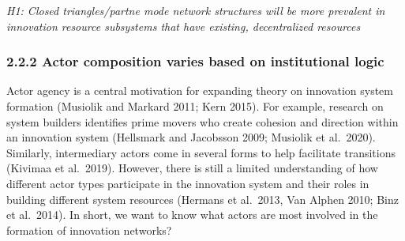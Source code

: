\documentclass[twoside,12pt,final]{ucthesis-CA2012}
\begin{document}
\begin{ucmainmatter}
\emph{H1: Closed triangles/partne mode network structures will be more
prevalent in innovation resource subsystems that have existing,
decentralized resources}

\hypertarget{actor-composition-varies-based-on-institutional-logic}{%
\subsubsection{2.2.2 Actor composition varies based on institutional logic}\label{actor-composition-varies-based-on-institutional-logic}}

Actor agency is a central motivation for expanding theory on innovation
system formation (Musiolik and Markard 2011; Kern 2015). For example,
research on \textquotesingle system builders\textquotesingle{} identifies prime movers who create
cohesion and direction within an innovation system (Hellsmark and
Jacobsson 2009; Musiolik et al.~2020). Similarly, \textquotesingle intermediary\textquotesingle{}
actors come in several forms to help facilitate transitions (Kivimaa et
al.~2019). However, there is still a limited understanding of how
different actor types participate in the innovation system and their
roles in building different system resources (Hermans et al.~2013, Van
Alphen 2010; Binz et al.~2014). In short, we want to know what actors
are most involved in the formation of innovation networks?


\end{ucmainmatter}
\end{document}
